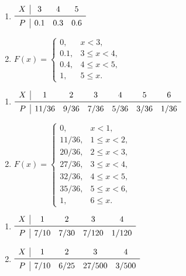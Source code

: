 \begin{answer}
  \item \begin{enumerate}
    \item $\begin{array}{c|ccc}
      X & 3 & 4 & 5 \\
      \midrule
      P & 0.1 & 0.3 & 0.6
    \end{array}$
    \item $F(x)=\begin{cases}
      0, & x<3, \\
      0.1, & 3\le x<4,\\
      0.4, & 4\le x<5, \\
      1, & 5\le x.
    \end{cases}$
  \end{enumerate}

  \item \begin{enumerate}
    \item $\begin{array}{c|cccccc}
      X & 1 & 2 & 3 & 4 & 5 & 6 \\
      \midrule
      P & 11/36 & 9/36 & 7/36 & 5/36 & 3/36 & 1/36
    \end{array}$
  \item $F(x)=\begin{cases}
    0, & x<1, \\
    11/36, & 1\le x<2, \\
    20/36, & 2\le x<3, \\
    27/36, & 3\le x<4, \\
    32/36, & 4\le x<5, \\
    35/36, & 5\le x<6, \\
    1, & 6\le x.
  \end{cases}$
  \end{enumerate}

  \item \begin{enumerate}
    \item $\begin{array}{c|cccc}
      X & 1 & 2 & 3 & 4 \\
      \midrule
      P & 7/10 & 7/30 & 7/120 & 1/120
    \end{array}$
    \item $\begin{array}{c|cccc}
      X & 1 & 2 & 3 & 4 \\
      \midrule
      P & 7/10 & 6/25 & 27/500 & 3/500
    \end{array}$
  \end{enumerate}


\end{answer}
